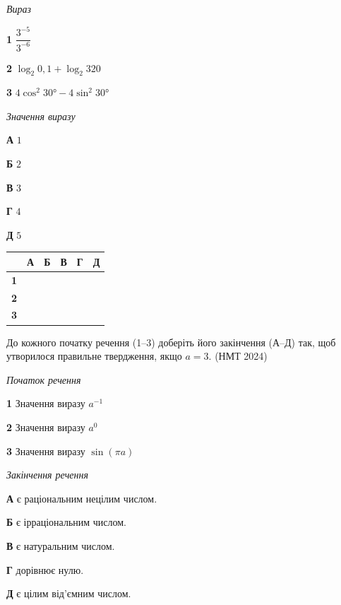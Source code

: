 \documentclass[14pt]{extarticle}
\newcommand{\matchTable}{
\begin{tabular}{|>{\centering\arraybackslash}p{0.2cm}|*{5}{>{\centering\arraybackslash}p{0.2cm}|}}
\hline
& \textbf{А} & \textbf{Б} & \textbf{В} & \textbf{Г} & \textbf{Д} \\
\hline
\textbf{1} & \rule{0pt}{0.2cm} & & & & \\
\hline
\textbf{2} & \rule{0pt}{0.2cm} & & & & \\
\hline
\textbf{3} & \rule{0pt}{0.2cm} & & & & \\
\hline
\end{tabular}
}
\newcommand{\task}[2]{\noindent\makebox[1.5em][l]{\textbf{#1.}}\parbox[t]{\dimexpr\textwidth-1.5em}{#2}}
\newcommand{\nmtyear}[1]{\hfill{\small\color{yearcolor}(НМТ #1)}}
\begin{document}
\vspace{0.3cm}
\begin{minipage}{0.4\textwidth}
\textit{Вираз}

\vspace{0.2cm}
\textbf{1} \quad $\dfrac{3^{-5}}{3^{-6}}$

\vspace{0.3cm}
\textbf{2} \quad $\log_2 0{,}1 + \log_2 320$

\vspace{0.2cm}
\textbf{3} \quad $4\cos^2 30° - 4\sin^2 30°$
\end{minipage}
\hfill
\begin{minipage}{0.3\textwidth}
\textit{Значення виразу}

\vspace{0.2cm}
\textbf{А} \quad $1$

\vspace{0.2cm}
\textbf{Б} \quad $2$

\vspace{0.2cm}
\textbf{В} \quad $3$

\vspace{0.2cm}
\textbf{Г} \quad $4$

\vspace{0.2cm}
\textbf{Д} \quad $5$
\end{minipage}
\hfill
\begin{minipage}{0.2\textwidth}
\matchTable
\end{minipage}

\vspace{0.7cm}

\task{22}{До кожного початку речення (1--3) доберіть його закінчення (А--Д) так, щоб утворилося правильне твердження, якщо $a = 3$. \nmtyear{2024}}

\vspace{0.3cm}
\begin{minipage}{0.4\textwidth}
\textit{Початок речення}

\vspace{0.2cm}
\textbf{1} \quad Значення виразу $a^{-1}$

\vspace{0.2cm}
\textbf{2} \quad Значення виразу $a^0$

\vspace{0.2cm}
\textbf{3} \quad Значення виразу $\sin(\pi a)$
\end{minipage}
\hfill
\begin{minipage}{0.4\textwidth}
\textit{Закінчення речення}

\vspace{0.2cm}
\textbf{А} \quad є раціональним нецілим числом.

\vspace{0.2cm}
\textbf{Б} \quad є ірраціональним числом.

\vspace{0.2cm}
\textbf{В} \quad є натуральним числом.

\vspace{0.2cm}
\textbf{Г} \quad дорівнює нулю.

\vspace{0.2cm}
\textbf{Д} \quad є цілим від'ємним числом.
\end{minipage}
\end{document}
